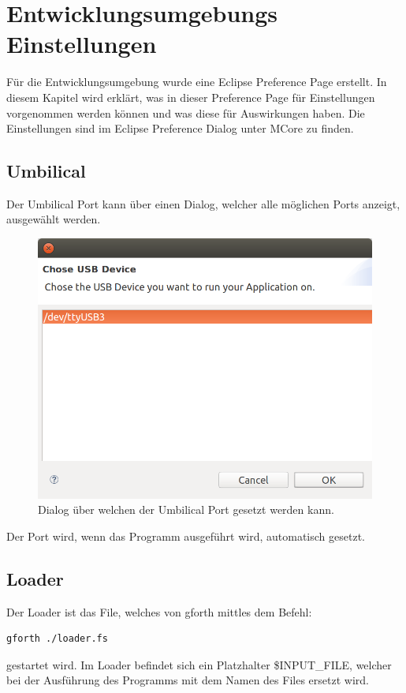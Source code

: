 \chapter{Entwicklungsumgebungs Einstellungen}
\label{settingschapter}
Für die Entwicklungsumgebung wurde eine Eclipse Preference Page erstellt. In diesem Kapitel wird erklärt, was in dieser Preference Page für Einstellungen vorgenommen werden können und was diese für Auswirkungen haben. Die Einstellungen sind im Eclipse Preference Dialog unter MCore zu finden.
\section{Umbilical}

Der Umbilical Port kann über einen Dialog, welcher alle möglichen Ports anzeigt, ausgewählt werden.

\begin{figure}[H]
	\centering
		\includegraphics[scale=0.3]{idesettings/umbilical.png}
		\caption{Dialog über welchen der Umbilical Port gesetzt werden kann.}
		\label{fig:extensionpoint}
\end{figure}

Der Port wird, wenn das Programm ausgeführt wird, automatisch gesetzt. 

\section{Loader}

Der Loader ist das File, welches von gforth mittles dem Befehl:
%
\begin{verbatim}
gforth ./loader.fs
\end{verbatim}
%
gestartet wird. Im Loader befindet sich ein Platzhalter \$INPUT\_FILE, welcher bei der Ausführung des Programms mit dem Namen des Files ersetzt wird.